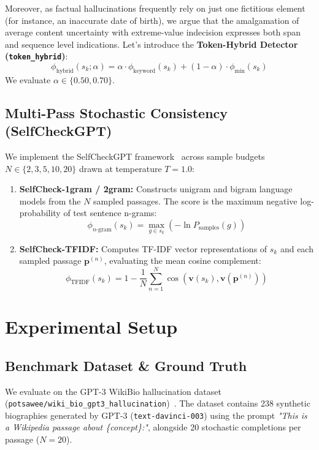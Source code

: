 \documentclass[conference]{IEEEtran}
\begin{document}
Moreover, as factual hallucinations frequently rely on just one fictitious element (for instance, an inaccurate date of birth), we argue that the amalgamation of average content uncertainty with extreme-value indecision expresses both span and sequence level indications. Let's introduce the \textbf{Token-Hybrid Detector (\texttt{token\_hybrid})}:
\begin{equation}
    \phi_{\text{hybrid}}(s_k; \alpha) = \alpha \cdot \phi_{\text{keyword}}(s_k) + (1 - \alpha) \cdot \phi_{\text{min}}(s_k)
\end{equation}
We evaluate $\alpha \in \{0.50, 0.70\}$.

\subsection{Multi-Pass Stochastic Consistency (SelfCheckGPT)}
We implement the SelfCheckGPT framework~\cite{manakul2023selfcheckgpt} across sample budgets $N \in \{2, 3, 5, 10, 20\}$ drawn at temperature $T=1.0$:
\begin{enumerate}
    \item \textbf{SelfCheck-1gram / 2gram:} Constructs unigram and bigram language models from the $N$ sampled passages. The score is the maximum negative log-probability of test sentence n-grams:
    \begin{equation}
        \phi_{n\text{-gram}}(s_k) = \max_{g \in s_k} \left( - \ln P_{\text{samples}}(g) \right)
    \end{equation}
    \item \textbf{SelfCheck-TFIDF:} Computes TF-IDF vector representations of $s_k$ and each sampled passage $\mathbf{p}^{(n)}$, evaluating the mean cosine complement:
    \begin{equation}
        \phi_{\text{TFIDF}}(s_k) = 1 - \frac{1}{N} \sum_{n=1}^N \cos\left(\mathbf{v}(s_k), \mathbf{v}(\mathbf{p}^{(n)})\right)
    \end{equation}
\end{enumerate}

\section{Experimental Setup}
\subsection{Benchmark Dataset \& Ground Truth}
We evaluate on the GPT-3 WikiBio hallucination dataset (\texttt{potsawee/wiki\_bio\_gpt3\_hallucination})~\cite{manakul2023selfcheckgpt}. The dataset contains 238 synthetic biographies generated by GPT-3 (\texttt{text-davinci-003}) using the prompt \textit{"This is a Wikipedia passage about \{concept\}:"}, alongside 20 stochastic completions per passage ($N=20$).
\end{document}
